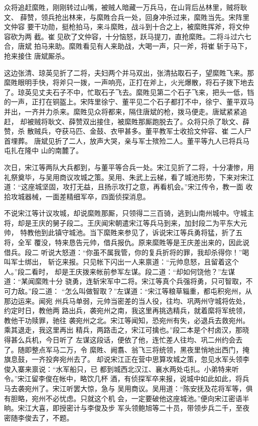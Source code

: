 众将追赶縻貹，刚刚转过山嘴，被贼人暗藏一万兵马，在山背后丛林里，贼将耿文、
薛赞，领兵抢出林来，与縻貹合兵一处，回身冲杀过来，縻貹当先。宋阵里文仲容
要干功勋，挺枪拍马，来斗縻貹，战斗到十合之上，被縻貹挥斧，将文仲容砍为两
截。崔见砍了文仲容，十分恼怒，跃马提刀，直抢縻貹。二将斗过六七合，唐斌
拍马来助。縻貹看见有人来助战，大喝一声，只一斧，将崔斩于马下，抢来接住
唐斌厮杀。

这边张清、琼英见折了二将，夫妇两个并马双出，张清拈取石子，望縻貹飞来。那
縻貹眼明手快，将斧只一拨，一声响亮，正打在斧上，火光爆散，将石子拨下地去
了。琼英见丈夫石子不中，忙取石子飞去。縻貹见第二个石子飞来，把头一低，铛
的一声，正打在铜盔上。宋阵里徐宁、董平见二个石子都打不中，徐宁、董平双马
并出，一齐并力杀来。縻貹见众将都来，隔住唐斌的枪，拨马便走。唐斌紧紧追赶，
却被贼将耿文、薛赞双出接住，被縻貹那厮跑脱去了。众将只杀了耿文、薛赞，杀
散贼兵，夺获马匹、金鼓、衣甲甚多。董平教军士收拾文仲容、崔二人尸首埋葬。
唐斌见折了二人，放声大哭，亲与军士殡殓二人。董平等九人已将兵马屯扎在隆中
山的南麓了。

次日，宋江等两队大兵都到，与董平等合兵一处。宋江见折了二将，十分凄惨，用
礼祭奠毕，与吴用商议攻城之策。吴用、朱武上云梯，看了城池形势，下来对宋江
道：“这座城坚固，攻打无益，且扬示攻打之意，再看机会。”宋江传令，教一面
收拾攻城器械，一面差精细军卒，四面侦探消息。

不说宋江等计议攻城，却说縻貹那厮，只领得二三百骑，逃到山南州城中。守城主
将，却是王庆的舅子段二。王庆闻宋朝遣宋江等兵马到来，加封段二为平东大元帅，
特教他到此镇守城池。当下縻貹来参见了，诉说宋江等兵勇将猛，折了五将，全军
覆没，特来恳告元帅，借兵报仇。原来縻貹等是王庆差出来的，因此说借兵。段二
听说大怒道：“你虽不属我管，你的复兵折将的罪，我却杀得你！”喝叫军士绑出，
斩讫来报。只见帐下闪出一人来禀道：“元帅息怒，且留着这个人。”段二看时，
却是王庆拨来帐前参军左谋。段二道：“却如何饶他？”左谋道：“某闻縻貹十分
骁勇，连斩宋军中二将。宋江等真个兵强将勇，只可智取，不可力敌。”段二道：
“怎么叫做智取？”左谋道：“宋江等粮草辎重，都屯积宛州，从那边运来。闻宛
州兵马单弱，元帅当密差的当人役，往均、巩两州守城将佐处，约定时日，教他两
路出兵，袭宛州之南，我这里再挑选精兵，就着縻将军统领，教他干功赎罪，驰往
袭宛州之北。宋江等闻知，恐宛州有失，必退兵去救宛州。乘其退走，我这里再出
精兵，两路击之，宋江可擒也。”段二本是个村卤汉，那晓得甚么兵机，今日听了
左谋这段话，便依了他，连忙差人往均、巩二州约会去了。随即整点军马二万，令
縻貹、阙翥、翁飞三将统领，黑夜里悄地出西门，掩旗息鼓，一齐投奔宛州去了。
却说宋江正在营中思算攻城之策，忽见水军头领李俊入寨来禀说：“水军船只，已
都到城西北汉江、襄水两处屯扎。小弟特来听令。”宋江留李俊在帐中，略饮几杯
酒，有侦探军卒来报，说城中如此如此，将兵马去袭宛州了。宋江听罢大惊，急与
吴用商议。吴用道：“陈安抚及花将军等，俱有胆略，宛州不必忧虑。只就这个机
会，一定要破他这座城池。”便向宋江密语半晌。宋江大喜，即授密计与李俊及步
军头领鲍旭等二十员，带领步兵二千，至夜密随李俊去了，不题。

